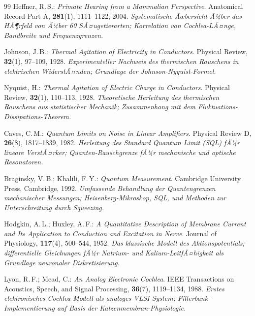 ﻿\documentclass[12pt,a4paper,titlepage]{report}
\begin{document}
\begin{thebibliography}{99}
Heffner, R.\,S.:
\textit{Primate Hearing from a Mammalian Perspective}.
Anatomical Record Part A, \textbf{281}(1), 1111--1122, 2004.
\newline\textit{Systematische Ãœbersicht Ã¼ber das HÃ¶rfeld von Ã¼ber 60
SÃ¤ugetierarten; Korrelation von Cochlea-LÃ¤nge, Bandbreite und Frequenzgrenzen.}

Johnson, J.\,B.:
\textit{Thermal Agitation of Electricity in Conductors}.
Physical Review, \textbf{32}(1), 97--109, 1928.
\newline\textit{Experimenteller Nachweis des thermischen Rauschens in elektrischen
WiderstÃ¤nden; Grundlage der Johnson-Nyquist-Formel.}

Nyquist, H.:
\textit{Thermal Agitation of Electric Charge in Conductors}.
Physical Review, \textbf{32}(1), 110--113, 1928.
\newline\textit{Theoretische Herleitung des thermischen Rauschens aus statistischer
Mechanik; Zusammenhang mit dem Fluktuations-Dissipations-Theorem.}

Caves, C.\,M.:
\textit{Quantum Limits on Noise in Linear Amplifiers}.
Physical Review D, \textbf{26}(8), 1817--1839, 1982.
\newline\textit{Herleitung des Standard Quantum Limit (SQL) fÃ¼r lineare VerstÃ¤rker;
Quanten-Rauschgrenze fÃ¼r mechanische und optische Resonatoren.}

Braginsky, V.\,B.; Khalili, F.\,Y.:
\textit{Quantum Measurement}.
Cambridge University Press, Cambridge, 1992.
\newline\textit{Umfassende Behandlung der Quantengrenzen mechanischer Messungen;
Heisenberg-Mikroskop, SQL, und Methoden zur Unterschreitung durch Squeezing.}

Hodgkin, A.\,L.; Huxley, A.\,F.:
\textit{A Quantitative Description of Membrane Current and Its Application to
Conduction and Excitation in Nerve}.
Journal of Physiology, \textbf{117}(4), 500--544, 1952.
\newline\textit{Das klassische Modell des Aktionspotentials; differentielle
Gleichungen fÃ¼r Natrium- und Kalium-LeitfÃ¤higkeit als Grundlage neuronaler
Diskretisierung.}

Lyon, R.\,F.; Mead, C.:
\textit{An Analog Electronic Cochlea}.
IEEE Transactions on Acoustics, Speech, and Signal Processing,
\textbf{36}(7), 1119--1134, 1988.
\newline\textit{Erstes elektronisches Cochlea-Modell als analoges VLSI-System;
Filterbank-Implementierung auf Basis der Katzenmembran-Physiologie.}


\end{thebibliography}
\end{document}

